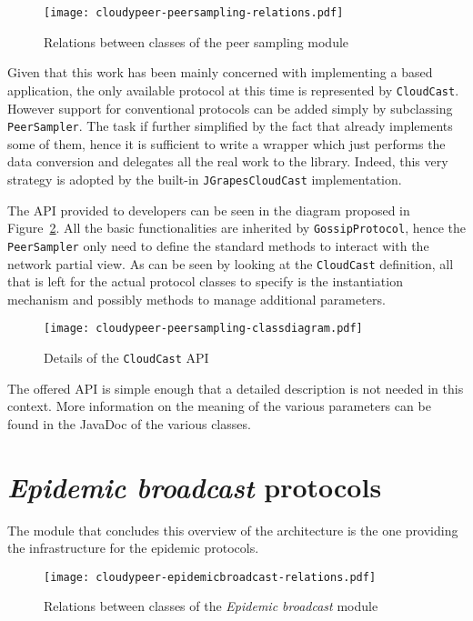 \begin{figure}[h!]
  \centering
  \texttt{[image: cloudypeer-peersampling-relations.pdf]}
  \caption{Relations between classes of the peer sampling module}
  \label{fig:cloudypeer-peersampling-relations}
\end{figure}

Given that this work has been mainly concerned with implementing a
\cloudcast based application, the only available protocol at this time
is represented by \texttt{CloudCast}. However support for
conventional protocols can be added simply by subclassing
\texttt{PeerSampler}. The task if further simplified by the fact that
\grapes already implements some of them, hence it is sufficient to
write a wrapper which just performs the data conversion and delegates
all the real work to the library. Indeed, this very strategy is adopted
by the built-in \texttt{JGrapesCloudCast} implementation.

The API provided to developers can be seen in the diagram proposed in
Figure~\ref{fig:cloudypeer-peersampling-class}. All the basic
functionalities are inherited by \texttt{GossipProtocol}, hence the
\texttt{PeerSampler} only need to define the standard methods to
interact with the network partial view. As can be seen by looking at
the \texttt{CloudCast} definition, all that is left for the actual
protocol classes to specify is the instantiation mechanism and
possibly methods to manage additional parameters.

\begin{figure}[h!]
  \hspace{-50pt}
  \texttt{[image: cloudypeer-peersampling-classdiagram.pdf]}
  \caption{Details of the \texttt{CloudCast} API}
  \label{fig:cloudypeer-peersampling-class}
\end{figure}

The offered API is simple enough that a detailed description is not
needed in this context. More information on the meaning of the
various parameters can be found in the JavaDoc of the various
classes.

\section{\emph{Epidemic broadcast} protocols}
The module that concludes this overview of the \cloudypeer
architecture is the one providing the infrastructure for the epidemic
protocols.

\begin{figure}[h!]
  \centering
  \texttt{[image: cloudypeer-epidemicbroadcast-relations.pdf]}
  \caption{Relations between classes of the \textit{Epidemic
      broadcast} module}
  \label{fig:cloudypeer-epidemicbroadcast-relations}
\end{figure}

